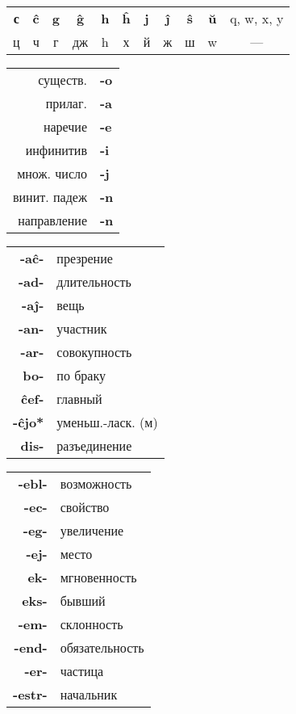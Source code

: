 \documentclass{article}
\def\b#1{\textbf{#1}}
\begin{document}
\begin{tabular}{ccccccccccc}
\b{с} & \b{ĉ} & \b{g} & \b{ĝ} & \b{h} & \b{ĥ} & \b{j} & \b{ĵ} & \b{ŝ} & \b{ŭ} & q, w, x, y \\
ц & ч & г & дж & h & х & й & ж & ш & w & --- \\
\end{tabular}

\begin{tabular}{r>{\bfseries}l}
существ. & -o \\
прилаг. & -a \\
наречие & -e \\
инфинитив & -i \\
множ. число & -j \\
винит. падеж & -n \\
направление & -n \\
\end{tabular}
\begin{tabular}{>{\bfseries}rl}
-aĉ- & презрение \\
-ad- & длительность \\
-aĵ- & вещь \\
-an- & участник \\
-ar- & совокупность \\
bo- & по браку \\
ĉef- & главный \\
-ĉjo* & уменьш.-ласк. (м) \\
dis- & разъединение \\
\end{tabular}
\begin{tabular}{>{\bfseries}rl}
-ebl- & возможность \\
-ec- & свойство \\
-eg- & увеличение \\
-ej- & место \\
ek- & мгновенность \\
eks- & бывший \\
-em- & склонность \\
-end- & обязательность \\
-er- & частица \\
-estr- & начальник \\
\end{tabular}
\end{document}
